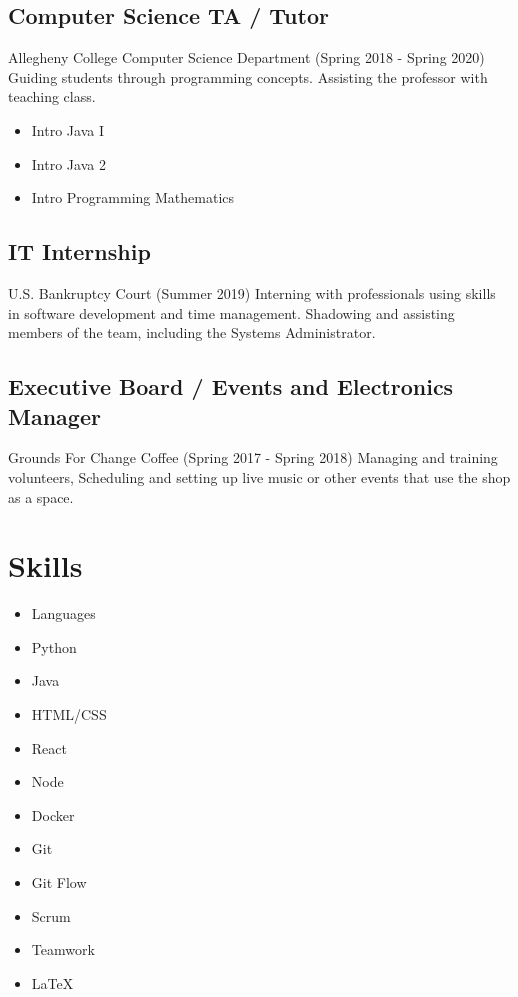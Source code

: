 \documentclass[12pt]{article}
\begin{document}
\subsection*{Computer Science TA / Tutor}
Allegheny College Computer Science Department (Spring 2018 - Spring 2020)
Guiding students through programming concepts. Assisting the professor with teaching class.

\begin{multicols}{2}
\begin{itemize}
    \item Intro Java I
    \item Intro Java 2
    \item Intro Programming Mathematics
\end{itemize}
\end{multicols}

\subsection*{IT Internship}
U.S. Bankruptcy Court (Summer 2019)
Interning with professionals using skills in software development and time management. Shadowing and assisting members of the team, including the Systems Administrator.

\subsection*{Executive Board / Events and Electronics Manager}
Grounds For Change Coffee (Spring 2017 - Spring 2018)
Managing and training volunteers, Scheduling and setting up live music or other events that use the shop as a space.


\section*{Skills}

\begin{multicols}{4}
\begin{itemize}
    \item Languages
    \item Python
    \item Java
    \item HTML/CSS
    \item React
    \item Node
    \item Docker
    \item Git
    \item Git Flow
    \item Scrum
    \item Teamwork
    \item \LaTeX
\end{itemize}
\end{multicols}
\end{document}
